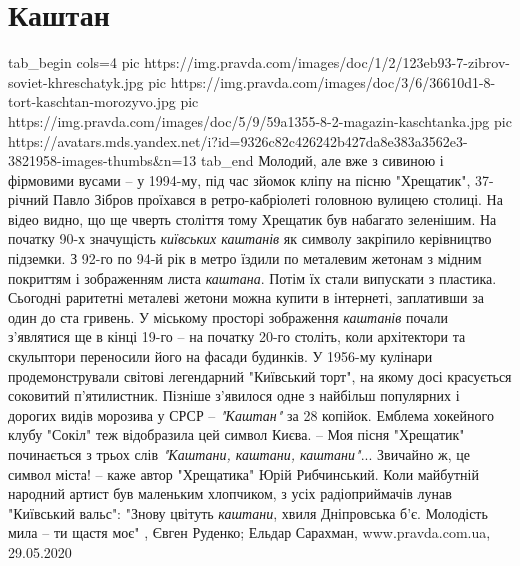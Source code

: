  
 
 
 
 
\chapter{Каштан}
\label{sec:slova.kashtan}

\ifcmt
  tab_begin cols=4
     pic https://img.pravda.com/images/doc/1/2/123eb93-7-zibrov-soviet-khreschatyk.jpg
     pic https://img.pravda.com/images/doc/3/6/36610d1-8-tort-kaschtan-morozyvo.jpg
		 pic https://img.pravda.com/images/doc/5/9/59a1355-8-2-magazin-kaschtanka.jpg
		 pic https://avatars.mds.yandex.net/i?id=9326c82c426242b427da8e383a3562e3-3821958-images-thumbs&n=13
  tab_end
\fi
Молодий, але вже з сивиною і фірмовими вусами – у 1994-му, під час зйомок кліпу
на пісню "Хрещатик", 37-річний Павло Зібров проїхався в ретро-кабріолеті
головною вулицею столиці.  На відео видно, що ще чверть століття тому Хрещатик
був набагато зеленішим. На початку 90-х значущість \emph{київських каштанів} як
символу закріпило керівництво підземки.  З 92-го по 94-й рік в метро їздили по
металевим жетонам з мідним покриттям і зображенням листа \emph{каштана}. Потім їх
стали випускати з пластика. Сьогодні раритетні металеві жетони можна купити в
інтернеті, заплативши за один до ста гривень.  У міському просторі зображення
\emph{каштанів} почали з'являтися ще в кінці 19-го – на початку 20-го століть, коли
архітектори та скульптори переносили його на фасади будинків.  У 1956-му
кулінари продемонстрували світові легендарний "Київський торт", на якому досі
красується соковитий п’ятилистник. Пізніше з'явилося одне з найбільш популярних
і дорогих видів морозива у СРСР – \emph{"Каштан"} за 28 копійок. Емблема хокейного
клубу "Сокіл" теж відобразила цей символ Києва.  – Моя пісня "Хрещатик"
починається з трьох слів \emph{"Каштани, каштани, каштани"}...  Звичайно ж, це
символ міста! – каже автор "Хрещатика" Юрій Рибчинський.  Коли майбутній
народний артист був маленьким хлопчиком, з усіх радіоприймачів лунав "Київський
вальс": "Знову цвітуть \emph{каштани}, хвиля Дніпровська б'є. Молодість мила –
ти щастя моє"
, 
Євген Руденко; Ельдар Сарахман, www.pravda.com.ua, 29.05.2020
